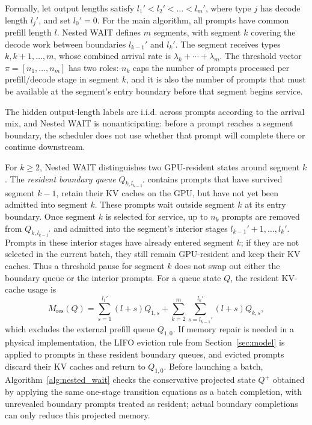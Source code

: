 Formally, let output lengths satisfy $l_1' < l_2' < \dots < l_m'$, where type $j$ has decode length $l_j'$, and set $l_0'=0$. For the main algorithm, all prompts have common prefill length \(l\). Nested WAIT defines \(m\) segments, with segment \(k\) covering the decode work between boundaries \(l_{k-1}'\) and \(l_k'\). The segment receives types \(k,k+1,\dots,m\), whose combined arrival rate is \(\lambda_k+\cdots+\lambda_m\). The threshold vector \(\pi=[n_1,\dots,n_m]\) has two roles: \(n_k\) caps the number of prompts processed per prefill/decode stage in segment \(k\), and it is also the number of prompts that must be available at the segment's entry boundary before that segment begins service.

The hidden output-length labels are i.i.d. across prompts according to the arrival mix, and Nested WAIT is nonanticipating: before a prompt reaches a segment boundary, the scheduler does not use whether that prompt will complete there or continue downstream.

For \(k\ge2\), Nested WAIT distinguishes two GPU-resident states around segment \(k\). The \emph{resident boundary queue} \(Q_{k,l_{k-1}'}\) contains prompts that have survived segment \(k-1\), retain their KV caches on the GPU, but have not yet been admitted into segment \(k\). These prompts wait outside segment \(k\) at its entry boundary. Once segment \(k\) is selected for service, up to \(n_k\) prompts are removed from \(Q_{k,l_{k-1}'}\) and admitted into the segment's interior stages \(l_{k-1}'+1,\ldots,l_k'\). Prompts in these interior stages have already entered segment \(k\); if they are not selected in the current batch, they still remain GPU-resident and keep their KV caches. Thus a threshold pause for segment \(k\) does not swap out either the boundary queue or the interior prompts. For a queue state \(Q\), the resident KV-cache usage is
\[
M_{\mathrm{res}}(Q)=\sum_{s=1}^{l_1'}(l+s)Q_{1,s}+\sum_{k=2}^m\sum_{s=l_{k-1}'}^{l_k'}(l+s)Q_{k,s},
\]
which excludes the external prefill queue \(Q_{1,0}\). If memory repair is needed in a physical implementation, the LIFO eviction rule from Section~\ref{sec:model} is applied to prompts in these resident boundary queues, and evicted prompts discard their KV caches and return to \(Q_{1,0}\).
Before launching a batch, Algorithm~\ref{alg:nested_wait} checks the conservative projected state \(Q^+\) obtained by applying the same one-stage transition equations as a batch completion, with unrevealed boundary prompts treated as resident; actual boundary completions can only reduce this projected memory.

